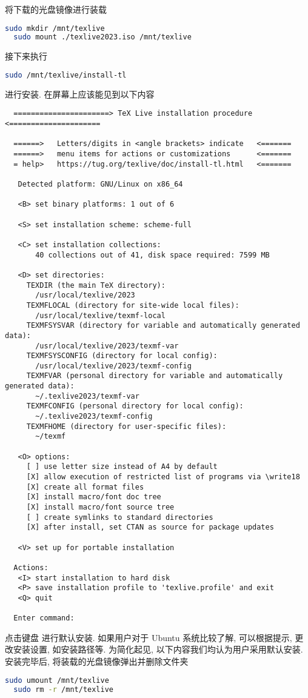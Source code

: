 将下载的光盘镜像进行装载
\begin{lstlisting}[language = bash]
  sudo mkdir /mnt/texlive
  sudo mount ./texlive2023.iso /mnt/texlive
\end{lstlisting}
接下来执行
\begin{lstlisting}[language = bash]
  sudo /mnt/texlive/install-tl
\end{lstlisting}
进行安装.
在屏幕上应该能见到以下内容
\begin{lstlisting}
  ======================> TeX Live installation procedure <=====================
  
  ======>   Letters/digits in <angle brackets> indicate   <=======
  ======>   menu items for actions or customizations      <=======
  = help>   https://tug.org/texlive/doc/install-tl.html   <=======
  
   Detected platform: GNU/Linux on x86_64
   
   <B> set binary platforms: 1 out of 6
  
   <S> set installation scheme: scheme-full
  
   <C> set installation collections:
       40 collections out of 41, disk space required: 7599 MB
  
   <D> set directories:
     TEXDIR (the main TeX directory):
       /usr/local/texlive/2023
     TEXMFLOCAL (directory for site-wide local files):
       /usr/local/texlive/texmf-local
     TEXMFSYSVAR (directory for variable and automatically generated data):
       /usr/local/texlive/2023/texmf-var
     TEXMFSYSCONFIG (directory for local config):
       /usr/local/texlive/2023/texmf-config
     TEXMFVAR (personal directory for variable and automatically generated data):
       ~/.texlive2023/texmf-var
     TEXMFCONFIG (personal directory for local config):
       ~/.texlive2023/texmf-config
     TEXMFHOME (directory for user-specific files):
       ~/texmf
  
   <O> options:
     [ ] use letter size instead of A4 by default
     [X] allow execution of restricted list of programs via \write18
     [X] create all format files
     [X] install macro/font doc tree
     [X] install macro/font source tree
     [ ] create symlinks to standard directories
     [X] after install, set CTAN as source for package updates
  
   <V> set up for portable installation
  
  Actions:
   <I> start installation to hard disk
   <P> save installation profile to 'texlive.profile' and exit
   <Q> quit
  
  Enter command: 
\end{lstlisting}
点击键盘  进行默认安装.
如果用户对于 Ubuntu 系统比较了解,
可以根据提示,
更改安装设置,
如安装路径等.
为简化起见,
以下内容我们均认为用户采用默认安装.
安装完毕后, 将装载的光盘镜像弹出并删除文件夹
\begin{lstlisting}[language = bash]
  sudo umount /mnt/texlive
  sudo rm -r /mnt/texlive
\end{lstlisting}

